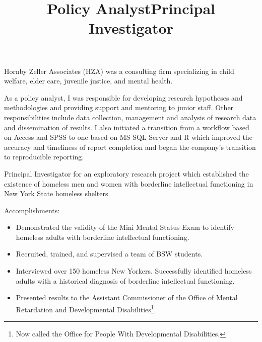 \documentclass[line, mm, 10pt]{res}
\begin{document}
\begin{resume}
  \title{Policy Analyst}
  \begin{position}
    Hornby Zeller Associates (HZA) was a consulting firm specializing in child
    welfare, elder care, juvenile justice, and mental health. 
    
    As a policy analyst, I was responsible for developing research hypotheses
    and methodologies and providing support and mentoring to junior staff. Other
    responsibilities include data collection, management and analysis of
    research data and dissemination of results. I also initiated a transition
    from a workflow based on Access and SPSS to one based on MS SQL Server and R
    which improved the accuracy and timeliness of report completion and began
    the company's transition to reproducible reporting.
  \end{position}

  \title{Principal Investigator}
  \begin{position}
    Principal Investigator for an exploratory research project which
    established the existence of homeless men and women with
    borderline intellectual functioning in New York State homeless
    shelters.

    Accomplishments:
    \begin{itemize}
    \item Demonstrated the validity of the Mini Mental Status Exam to
      identify homeless adults with borderline intellectual functioning.
    \item Recruited, trained, and supervised a team of BSW students.
    \item Interviewed over 150 homeless New Yorkers. Successfully
      identified homeless adults with a historical diagnosis of
      borderline intellectual functioning.
    \item Presented results to the Assistant Commissioner
      of the Office of Mental Retardation and Developmental
      Disabilities\footnote{Now called the Office for People With
        Developmental Disabilities.}.
    \end{itemize}
  \end{position}



\end{resume}
\end{document}
